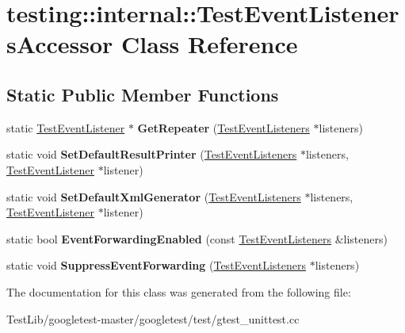 \hypertarget{classtesting_1_1internal_1_1TestEventListenersAccessor}{}\section{testing\+:\+:internal\+:\+:Test\+Event\+Listeners\+Accessor Class Reference}
\label{classtesting_1_1internal_1_1TestEventListenersAccessor}
\subsection*{Static Public Member Functions}
\begin{DoxyCompactItemize}
\item 
\mbox{\label{classtesting_1_1internal_1_1TestEventListenersAccessor_a07c6f8644e509d0f23c0c16a60856387}} 
static \hyperlink{classtesting_1_1TestEventListener}{Test\+Event\+Listener} $\ast$ {\bfseries Get\+Repeater} (\hyperlink{classtesting_1_1TestEventListeners}{Test\+Event\+Listeners} $\ast$listeners)
\item 
\mbox{\label{classtesting_1_1internal_1_1TestEventListenersAccessor_ac8886c7cea5a4ad39aed276d3f58da75}} 
static void {\bfseries Set\+Default\+Result\+Printer} (\hyperlink{classtesting_1_1TestEventListeners}{Test\+Event\+Listeners} $\ast$listeners, \hyperlink{classtesting_1_1TestEventListener}{Test\+Event\+Listener} $\ast$listener)
\item 
\mbox{\label{classtesting_1_1internal_1_1TestEventListenersAccessor_a8c04463b5ba5ee6d6da36e2171c7fff0}} 
static void {\bfseries Set\+Default\+Xml\+Generator} (\hyperlink{classtesting_1_1TestEventListeners}{Test\+Event\+Listeners} $\ast$listeners, \hyperlink{classtesting_1_1TestEventListener}{Test\+Event\+Listener} $\ast$listener)
\item 
\mbox{\label{classtesting_1_1internal_1_1TestEventListenersAccessor_a4a7522557045cb55eb037dc61429d71c}} 
static bool {\bfseries Event\+Forwarding\+Enabled} (const \hyperlink{classtesting_1_1TestEventListeners}{Test\+Event\+Listeners} \&listeners)
\item 
\mbox{\label{classtesting_1_1internal_1_1TestEventListenersAccessor_abfc0a0f8163465f4f5d42436ec8c7cb3}} 
static void {\bfseries Suppress\+Event\+Forwarding} (\hyperlink{classtesting_1_1TestEventListeners}{Test\+Event\+Listeners} $\ast$listeners)
\end{DoxyCompactItemize}


The documentation for this class was generated from the following file\+:\begin{DoxyCompactItemize}
\item 
Test\+Lib/googletest-\/master/googletest/test/gtest\+\_\+unittest.\+cc\end{DoxyCompactItemize}
